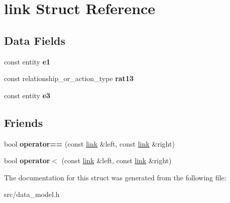 \hypertarget{structlink}{}\section{link Struct Reference}
\label{structlink}
\subsection*{Data Fields}
\begin{DoxyCompactItemize}
\item 
\mbox{\label{structlink_a5a3eda51498d357ce568579c1518ddc0}} 
const entity {\bfseries e1}
\item 
\mbox{\label{structlink_a926504798d48f1e25b0c5217ef96bd9a}} 
const relationship\+\_\+or\+\_\+action\+\_\+type {\bfseries rat13}
\item 
\mbox{\label{structlink_ab87c26d64d781c9173d767772a45e9f0}} 
const entity {\bfseries e3}
\end{DoxyCompactItemize}
\subsection*{Friends}
\begin{DoxyCompactItemize}
\item 
\mbox{\label{structlink_a383e61e15072ef3fe9e16102dea483e0}} 
bool {\bfseries operator==} (const \hyperlink{structlink}{link} \&left, const \hyperlink{structlink}{link} \&right)
\item 
\mbox{\label{structlink_af79bc13140c8180154526642748b0c33}} 
bool {\bfseries operator$<$} (const \hyperlink{structlink}{link} \&left, const \hyperlink{structlink}{link} \&right)
\end{DoxyCompactItemize}


The documentation for this struct was generated from the following file\+:\begin{DoxyCompactItemize}
\item 
src/data\+\_\+model.\+h\end{DoxyCompactItemize}
